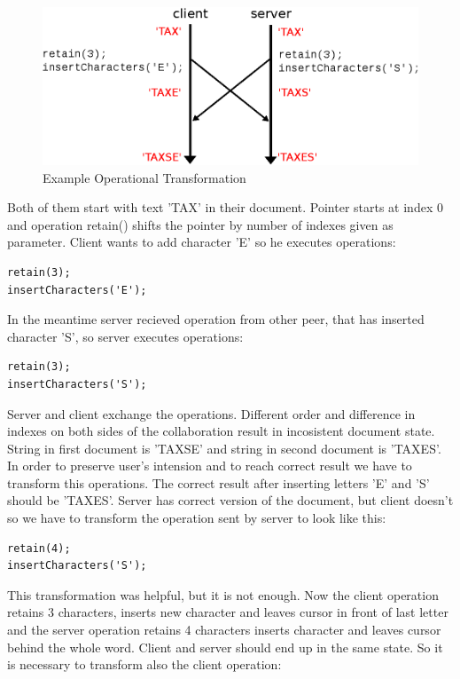 \documentclass[12pt,oneside]{fithesis2}
\begin{document}
\begin{figure}[H]
\caption{Example Operational Transformation}
\label{fig:ot}
\centering
\vspace{5mm}
\includegraphics{op1}
\end{figure}
Both of them start with text 'TAX' in their document. Pointer starts at index 0 and operation retain() shifts the pointer by number of indexes given as parameter. Client wants to add character 'E' so he executes operations:
\vspace{3mm}
\begin{verbatim}
retain(3);
insertCharacters('E');
\end{verbatim} 
\vspace{3mm}
In the meantime server recieved operation from other peer, that has inserted character 'S', so server executes operations:
\vspace{3mm} 
\begin{verbatim}
retain(3);
insertCharacters('S');
\end{verbatim}
\vspace{3mm}
Server and client exchange the operations. Different order and difference in indexes on both sides of the collaboration result in incosistent document state. String in first document is 'TAXSE' and string in second document is 'TAXES'.  In order to preserve user's intension and to reach correct result we have to transform this operations. The correct result after inserting letters 'E' and 'S' should be 'TAXES'. Server has correct version of the document, but client doesn't so we have to transform the operation sent by server to look like this:
\vspace{3mm}
\begin{verbatim}
retain(4);
insertCharacters('S');
\end{verbatim}
\vspace{3mm}
This transformation was helpful, but it is not enough. Now the client operation retains 3 characters, inserts new character and leaves cursor in front of last letter and the server operation retains 4 characters inserts character and leaves cursor behind the whole word. Client and server should end up in the same state. So it is necessary to transform also the client operation: 
\end{document}

